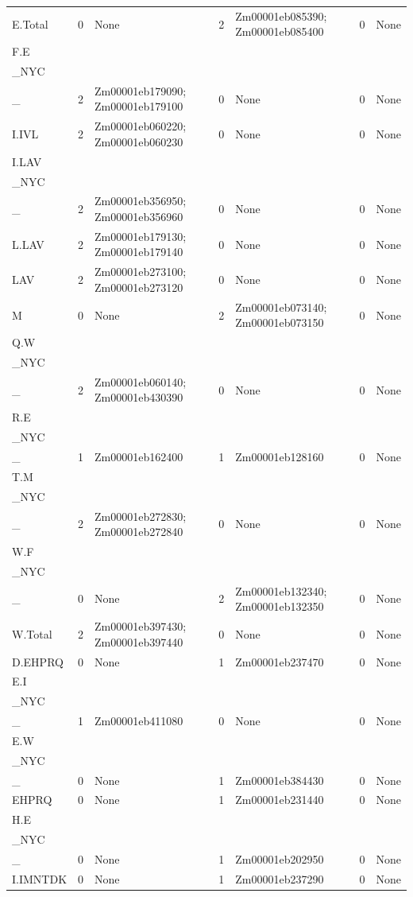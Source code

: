 \begin{longtable}{p{1.9cm}p{0.9cm}p{4.8cm}p{0.9cm}p{4.8cm}p{0.9cm}p{3.2cm}}
E.Total & 0 & None & 2 & Zm00001eb085390; Zm00001eb085400 & 0 & None \\
F.E\\_NYC\\_ & 2 & Zm00001eb179090; Zm00001eb179100 & 0 & None & 0 & None \\
I.IVL & 2 & Zm00001eb060220; Zm00001eb060230 & 0 & None & 0 & None \\
I.LAV\\_NYC\\_ & 2 & Zm00001eb356950; Zm00001eb356960 & 0 & None & 0 & None \\
L.LAV & 2 & Zm00001eb179130; Zm00001eb179140 & 0 & None & 0 & None \\
LAV & 2 & Zm00001eb273100; Zm00001eb273120 & 0 & None & 0 & None \\
M & 0 & None & 2 & Zm00001eb073140; Zm00001eb073150 & 0 & None \\
Q.W\\_NYC\\_ & 2 & Zm00001eb060140; Zm00001eb430390 & 0 & None & 0 & None \\
R.E\\_NYC\\_ & 1 & Zm00001eb162400 & 1 & Zm00001eb128160 & 0 & None \\
T.M\\_NYC\\_ & 2 & Zm00001eb272830; Zm00001eb272840 & 0 & None & 0 & None \\
W.F\\_NYC\\_ & 0 & None & 2 & Zm00001eb132340; Zm00001eb132350 & 0 & None \\
W.Total & 2 & Zm00001eb397430; Zm00001eb397440 & 0 & None & 0 & None \\
D.EHPRQ & 0 & None & 1 & Zm00001eb237470 & 0 & None \\
E.I\\_NYC\\_ & 1 & Zm00001eb411080 & 0 & None & 0 & None \\
E.W\\_NYC\\_ & 0 & None & 1 & Zm00001eb384430 & 0 & None \\
EHPRQ & 0 & None & 1 & Zm00001eb231440 & 0 & None \\
H.E\\_NYC\\_ & 0 & None & 1 & Zm00001eb202950 & 0 & None \\
I.IMNTDK & 0 & None & 1 & Zm00001eb237290 & 0 & None \\

\end{longtable}
